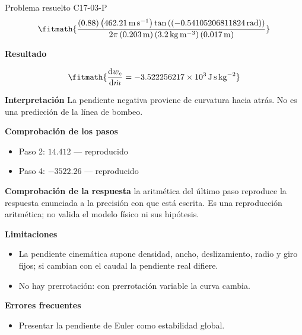 \documentclass[10pt,openany]{book}
\begin{document}
\begin{studiumworked}{Problema resuelto C17-03-P}
\[
\fitmath{\frac{\left(0.88\right) \left(462.21\,\mathrm{m}\,\mathrm{s}^{-1}\right) \tan{\left(\left(-0.54105206811824\,\mathrm{rad}\right) \right)}}{2 \pi \left(0.203\,\mathrm{m}\right) \left(3.2\,\mathrm{kg}\,\mathrm{m}^{-3}\right) \left(0.017\,\mathrm{m}\right)}}
\]

\noindent\textbf{Resultado}

\[
\fitmath{\frac{\mathrm{d}w_c}{\mathrm{d}\dot{m}}=-3.522256217\times10^{3}\,\mathrm{J}\,\mathrm{s}\,\mathrm{kg}^{-2}}
\]

\noindent\textbf{Interpretación}
La pendiente negativa proviene de curvatura hacia atrás. No es una predicción de la línea de bombeo.

\noindent\textbf{Comprobación de los pasos}
\begin{itemize}
\item Paso 2: $14.412$ — reproducido
\item Paso 4: $-3522.26$ — reproducido
\end{itemize}

\noindent\textbf{Comprobación de la respuesta} la aritmética del último paso reproduce la respuesta enunciada a la precisión con que está escrita. Es una reproducción aritmética; no valida el modelo físico ni sus hipótesis.

\noindent\textbf{Limitaciones}
\begin{itemize}
\item La pendiente cinemática supone densidad, ancho, deslizamiento, radio y giro fijos; si cambian con el caudal la pendiente real difiere.
\item No hay prerrotación: con prerrotación variable la curva cambia.
\end{itemize}

\noindent\textbf{Errores frecuentes}
\begin{itemize}
\item Presentar la pendiente de Euler como estabilidad global.
\end{itemize}
\end{studiumworked}
\end{document}
